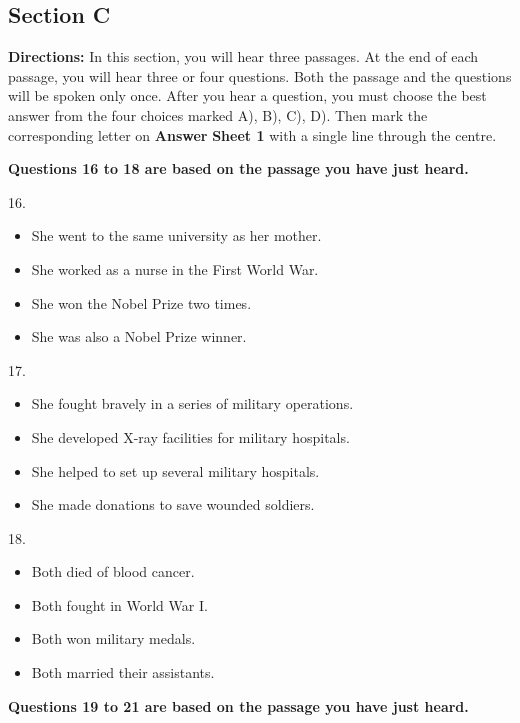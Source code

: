 \documentclass[UTF8,11pt]{ctexart}
\begin{document}
\subsection*{\textbf{Section C}}


\textbf{Directions:} In this section, you will hear three passages. At the end of each passage, you will hear three or four questions. Both the passage and the questions will be spoken only once. After you hear a question, you must choose the best answer from the four choices marked A), B), C), D). Then mark the corresponding letter on\textbf{ Answer} \textbf{Sheet 1} with a single line through the centre.


\textbf{Questions 16 to 18 are based on the passage you have just heard.}


16.


\begin{itemize}[leftmargin=2em,itemsep=.2em,topsep=.4em]\item[A.] She went to the same university as her mother.
\item[B.] She worked as a nurse in the First World War.
\item[C.] She won the Nobel Prize two times.
\item[D.] She was also a Nobel Prize winner.
\end{itemize}

17.


\begin{itemize}[leftmargin=2em,itemsep=.2em,topsep=.4em]\item[A.] She fought bravely in a series of military operations.
\item[B.] She developed X-ray facilities for military hospitals.
\item[C.] She helped to set up several military hospitals.
\item[D.] She made donations to save wounded soldiers.
\end{itemize}

18.


\begin{itemize}[leftmargin=2em,itemsep=.2em,topsep=.4em]\item[A.] Both died of blood cancer.
\item[B.] Both fought in World War I.
\item[C.] Both won military medals.
\item[D.] Both married their assistants.
\end{itemize}

\textbf{Questions 19 to 21 are based on the passage you have just heard.}
\end{document}
